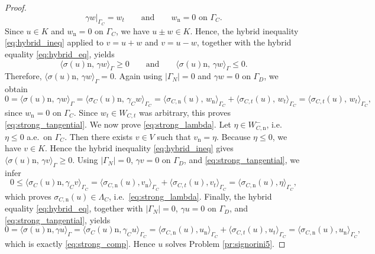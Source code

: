 \begin{proof}
	\begin{equation*}
		\gamma w|_{\Gamma_C}=w_t
		\qquad\text{and}\qquad
		w_\mathrm n=0\text{ on }\Gamma_C.
	\end{equation*}
	Since $u\in K$ and $w_\mathrm n=0$ on $\Gamma_C$, we have $u\pm w\in K$. Hence, the hybrid inequality \eqref{eq:hybrid_ineq} applied to $v=u+w$ and $v=u-w$, together with the hybrid equality \eqref{eq:hybrid_eq}, yields
	\begin{equation*}
		\langle \sigma(u)\mathrm n,\,\gamma w\rangle_\Gamma\ge 0
		\qquad\text{and}\qquad
		\langle \sigma(u)\mathrm n,\,\gamma w\rangle_\Gamma\le 0.
	\end{equation*}
	Therefore, $\langle \sigma(u)\mathrm n,\,\gamma w\rangle_\Gamma=0$. Again using $|\Gamma_N| = 0$ and $\gamma w = 0$ on $\Gamma_D$, we obtain
	\begin{equation*}
		0 = \langle\sigma(u)\mathrm{n},\,\gamma w\rangle_\Gamma = \langle\sigma_C(u)\mathrm{n},\,\gamma_C w\rangle_{\Gamma_C} = \langle \sigma_{C,\mathrm{n}}(u),\,w_\mathrm n\rangle_{\Gamma_C}+\langle \sigma_{C,t}(u),\,w_t\rangle_{\Gamma_C}=\langle \sigma_{C,t}(u),\,w_t\rangle_{\Gamma_C},
	\end{equation*}
	since $w_\mathrm{n} = 0$ on $\Gamma_C$. Since $w_t\in W_{C,t}$ was arbitrary, this proves \eqref{eq:strong_tangential}. We now prove \eqref{eq:strong_lambda}. Let $\eta\in W_{C,\mathrm{n}}^{-}$, i.e.\ $\eta\le 0$ a.e.\ on $\Gamma_C$. Then there exists $v\in V$ such that $v_\mathrm n=\eta$. Because $\eta\le 0$, we have $v\in K$. Hence the hybrid inequality \eqref{eq:hybrid_ineq} gives $\langle \sigma(u)\mathrm n,\,\gamma v\rangle_\Gamma\ge 0$. Using $|\Gamma_N|=0$, $\gamma v=0$ on $\Gamma_D$, and \eqref{eq:strong_tangential}, we infer
	\begin{equation*}
		0\le \langle \sigma_C(u)\mathrm n,\gamma_C v\rangle_{\Gamma_C}
		=\langle \sigma_{C,\mathrm{n}}(u),v_\mathrm n\rangle_{\Gamma_C}
		+\langle \sigma_{C,t}(u),v_t\rangle_{\Gamma_C}
		=\langle \sigma_{C,\mathrm{n}}(u),\eta\rangle_{\Gamma_C},
	\end{equation*}
	which proves $\sigma_{C,\mathrm{n}}(u)\in\Lambda_C$, i.e.\ \eqref{eq:strong_lambda}. Finally, the hybrid equality \eqref{eq:hybrid_eq}, together with $|\Gamma_N|=0$, $\gamma u=0$ on $\Gamma_D$, and \eqref{eq:strong_tangential}, yields
	\begin{equation*}
		0=\langle \sigma(u)\mathrm n,\gamma u\rangle_\Gamma
		=\langle \sigma_C(u)\mathrm n,\gamma_C u\rangle_{\Gamma_C}
		=\langle \sigma_{C,\mathrm{n}}(u),u_\mathrm n\rangle_{\Gamma_C}
		+\langle \sigma_{C,t}(u),u_t\rangle_{\Gamma_C}
		=\langle \sigma_{C,\mathrm{n}}(u),u_\mathrm n\rangle_{\Gamma_C},
	\end{equation*}
	which is exactly \eqref{eq:strong_comp}. Hence $u$ solves Problem \ref{pr:signorini5}.
\end{proof}

